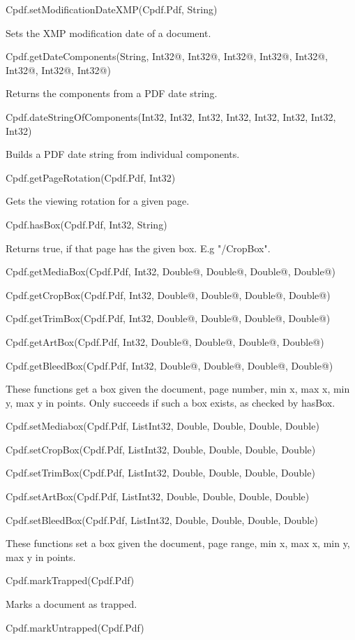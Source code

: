 Cpdf.setModificationDateXMP(Cpdf.Pdf, String)

Sets the XMP modification date of a document.

Cpdf.getDateComponents(String, Int32@, Int32@, Int32@, Int32@, Int32@, Int32@,
Int32@, Int32@)

Returns the components from a PDF date string.

Cpdf.dateStringOfComponents(Int32, Int32, Int32, Int32, Int32, Int32, Int32,
Int32)

Builds a PDF date string from individual components.

Cpdf.getPageRotation(Cpdf.Pdf, Int32)

Gets the viewing rotation for a given page.

Cpdf.hasBox(Cpdf.Pdf, Int32, String)

Returns true, if that page has the given box. E.g "/CropBox".

Cpdf.getMediaBox(Cpdf.Pdf, Int32, Double@, Double@, Double@, Double@)

Cpdf.getCropBox(Cpdf.Pdf, Int32, Double@, Double@, Double@, Double@)

Cpdf.getTrimBox(Cpdf.Pdf, Int32, Double@, Double@, Double@, Double@)

Cpdf.getArtBox(Cpdf.Pdf, Int32, Double@, Double@, Double@, Double@)

Cpdf.getBleedBox(Cpdf.Pdf, Int32, Double@, Double@, Double@, Double@)

These functions get a box given the document, page number, min x, max x, 
min y, max y in points. Only succeeds if such a box exists, as checked by
hasBox.

Cpdf.setMediabox(Cpdf.Pdf, List{Int32}, Double, Double, Double, Double)

Cpdf.setCropBox(Cpdf.Pdf, List{Int32}, Double, Double, Double, Double)

Cpdf.setTrimBox(Cpdf.Pdf, List{Int32}, Double, Double, Double, Double)

Cpdf.setArtBox(Cpdf.Pdf, List{Int32}, Double, Double, Double, Double)

Cpdf.setBleedBox(Cpdf.Pdf, List{Int32}, Double, Double, Double, Double)

These functions set a box given the document, page range, min x, max x, 
min y, max y in points.

Cpdf.markTrapped(Cpdf.Pdf)

Marks a document as trapped.

Cpdf.markUntrapped(Cpdf.Pdf)

